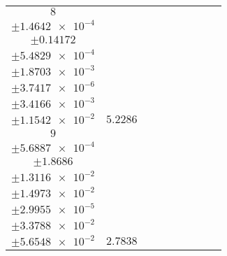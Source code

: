 \documentclass[8pt]{article}
\begin{document}
\begin{longtable}[l]{c c c c c c c c c}
$\num{8}$ & \begin{tabular}[c]{@{}c@{}}$\num{5.9912e-2}$ \\ $\pm\num{1.4642e-4}$\end{tabular} & \begin{tabular}[c]{@{}c@{}}$\num{-0.14155}$ \\ $\pm\num{0.14172}$\end{tabular} & \begin{tabular}[c]{@{}c@{}}$\num{10.344}$ \\ $\pm\num{5.4829e-4}$\end{tabular} & \begin{tabular}[c]{@{}c@{}}$\num{1.5762e+3}$ \\ $\pm\num{1.8703e-3}$\end{tabular} & \begin{tabular}[c]{@{}c@{}}$\num{3.1532}$ \\ $\pm\num{3.7417e-6}$\end{tabular} & \begin{tabular}[c]{@{}c@{}}$\num{1.1688}$ \\ $\pm\num{3.4166e-3}$\end{tabular} & \begin{tabular}[c]{@{}c@{}}$\num{4.1913}$ \\ $\pm\num{1.1542e-2}$\end{tabular} & $\num{5.2286}$\\
$\num{9}$ & \begin{tabular}[c]{@{}c@{}}$\num{4.1159e-2}$ \\ $\pm\num{5.6887e-4}$\end{tabular} & \begin{tabular}[c]{@{}c@{}}$\num{-1.5469}$ \\ $\pm\num{1.8686}$\end{tabular} & \begin{tabular}[c]{@{}c@{}}$\num{1.913}$ \\ $\pm\num{1.3116e-2}$\end{tabular} & \begin{tabular}[c]{@{}c@{}}$\num{1.5764e+3}$ \\ $\pm\num{1.4973e-2}$\end{tabular} & \begin{tabular}[c]{@{}c@{}}$\num{3.1537}$ \\ $\pm\num{2.9955e-5}$\end{tabular} & \begin{tabular}[c]{@{}c@{}}$\num{3.2938}$ \\ $\pm\num{3.3788e-2}$\end{tabular} & \begin{tabular}[c]{@{}c@{}}$\num{5.9759}$ \\ $\pm\num{5.6548e-2}$\end{tabular} & $\num{2.7838}$\\

\end{longtable}
\end{document}

